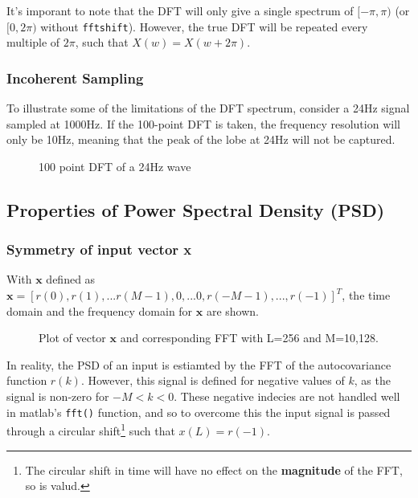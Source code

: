 \documentclass[main.tex]{subfiles}
\begin{document}
It's imporant to note that the DFT will only give a single spectrum of $[-\pi,\pi)$ (or $[0, 2\pi)$ without {\tt fftshift}). However, the true DFT will be repeated every multiple of $2\pi$, such that $X(w) = X(w+2\pi)$.

\subsubsection{Incoherent Sampling}

To illustrate some of the limitations of the DFT spectrum, consider a 24Hz signal sampled at 1000Hz. If the 100-point DFT is taken, the frequency resolution will only be 10Hz, meaning that the peak of the lobe at 24Hz will not be captured. 

\begin{figure}[H]
	\centering 
	\resizebox{0.8\textwidth}{!}{}
	\caption{100 point DFT of a 24Hz wave}
	\label{fig:q1_1_c}
\end{figure}





\subsection{Properties of Power Spectral Density (PSD)}


\subsubsection{Symmetry of input vector x}

With $\textbf{x}$ defined as $\textbf{x} = [r(0), r(1),...r(M-1),0,...0,r(-M-1),...,r(-1)]^T$, the time domain and the frequency domain for $\textbf{x}$ are shown. 

\begin{figure}[H]
	\centering 
	\resizebox{\textwidth}{!}{}
	\caption{Plot of vector $\textbf{x}$ and corresponding FFT with L=256 and M=10,128.}
	\label{fig:q1_2_a}
\end{figure}


In reality, the PSD of an input is estiamted by the FFT of the autocovariance function $r(k)$. However, this signal is defined for negative values of $k$, as the signal is non-zero for $-M < k < 0$. These negative indecies are not handled well in matlab's {\tt fft()} function, and so to overcome this the input signal is passed through a circular shift\footnote{The circular shift in time will have no effect on the \textbf{magnitude} of the FFT, so is valud.} such that $x(L) = r(-1)$.
\end{document}
